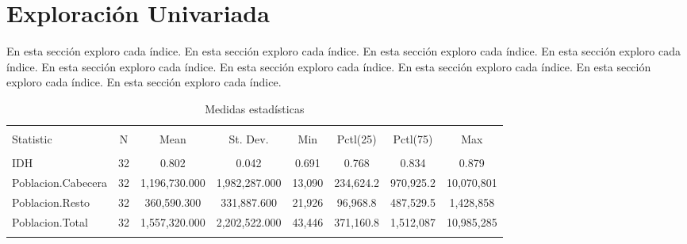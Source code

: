 

\section{Exploración Univariada}\label{univariada}

En esta sección exploro cada índice. En esta sección exploro cada índice. En esta sección exploro cada índice. En esta sección exploro cada índice. En esta sección exploro cada índice. En esta sección exploro cada índice. En esta sección exploro cada índice. En esta sección exploro cada índice. En esta sección exploro cada índice.

\begin{table}[!htbp] \centering 
  \caption{Medidas estadísticas} 
  \label{stats} 
\begin{tabular}{@{\extracolsep{5pt}}lccccccc} 
\\[-1.8ex]\hline 
\hline \\[-1.8ex] 
Statistic & \multicolumn{1}{c}{N} & \multicolumn{1}{c}{Mean} & \multicolumn{1}{c}{St. Dev.} & \multicolumn{1}{c}{Min} & \multicolumn{1}{c}{Pctl(25)} & \multicolumn{1}{c}{Pctl(75)} & \multicolumn{1}{c}{Max} \\ 
\hline \\[-1.8ex] 
IDH & 32 & 0.802 & 0.042 & 0.691 & 0.768 & 0.834 & 0.879 \\ 
Poblacion.Cabecera & 32 & 1,196,730.000 & 1,982,287.000 & 13,090 & 234,624.2 & 970,925.2 & 10,070,801 \\ 
Poblacion.Resto & 32 & 360,590.300 & 331,887.600 & 21,926 & 96,968.8 & 487,529.5 & 1,428,858 \\ 
Poblacion.Total & 32 & 1,557,320.000 & 2,202,522.000 & 43,446 & 371,160.8 & 1,512,087 & 10,985,285 \\ 
\hline \\[-1.8ex] 
\end{tabular} 
\end{table} 
